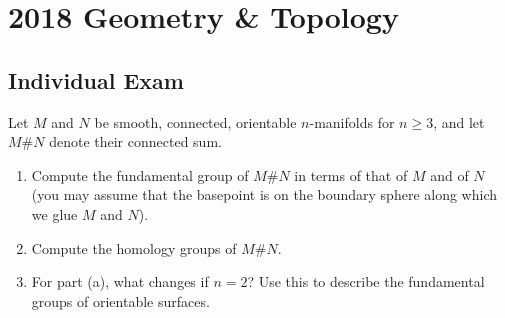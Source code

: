 \section{2018 Geometry \& Topology}

\subsection{Individual Exam}

\begin{exercise}
\label{geometry:2018:1}
Let $M$ and $N$ be smooth, connected, orientable $n$-manifolds for $n \geq 3$, and let $M \# N$ denote their connected sum.
\begin{enumerate}
    \item[(a)] Compute the fundamental group of $M \# N$ in terms of that of $M$ and of $N$ (you may assume that the basepoint is on the boundary sphere along which we glue $M$ and $N$).
    \item[(b)] Compute the homology groups of $M \# N$.
    \item[(c)] For part (a), what changes if $n = 2$? Use this to describe the fundamental groups of orientable surfaces.
\end{enumerate}
\end{exercise}

